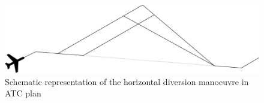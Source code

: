 \begin{figure}[ht]
    \centering
    \includegraphics[width=\textwidth]{figures/diversion.pdf}
    \caption{Schematic representation of the horizontal diversion manoeuvre in ATC plan}
    \label{fig:diversion}
\end{figure}

